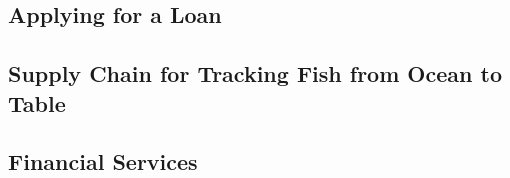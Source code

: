 \subsection{Applying for a Loan}


\subsection{Supply Chain for Tracking Fish from Ocean to Table}


\subsection{Financial Services}
